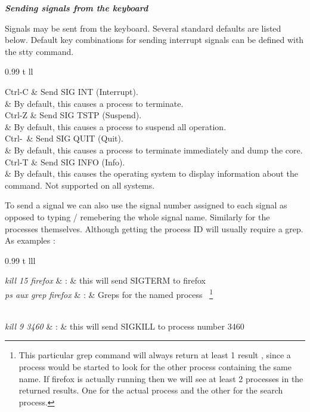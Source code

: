 

\textbf{\textit{Sending signals from the keyboard}}

Signals may be sent from the keyboard. Several standard defaults are listed below. Default key combinations for sending interrupt signals can be defined with the stty command.



\tabulartable
{0.99\linewidth}
{t}
{ll}
{


Ctrl-C & Send SIG INT (Interrupt).  \\
&  By default, this causes a process to terminate.  \\

Ctrl-Z & Send SIG TSTP (Suspend).  \\
&  By default, this causes a process to suspend all operation. \\

Ctrl-\ & Send SIG QUIT (Quit).  \\
&  By default, this causes a process to terminate immediately and dump the
core. \\

Ctrl-T & Send SIG INFO (Info).  \\
&  By default, this causes the operating system to display information about
the command. Not supported on all systems. \\

}


To send a signal we can also use the signal number assigned to each signal as
opposed to typing / remebering the whole signal name. Similarly for the
processes themselves. Although getting the process ID will usually require a
grep. As examples :


\tabulartable
{0.99\linewidth}
{t}
{lll}
{

\textit{kill 15 firefox} & : & this will send SIGTERM to firefox\\

\textit{ps aux \textbar grep firefox} & : & Greps for the named process
~\footnote{
This particular grep command will always return at least 1 result , since a
process would be started to look for the other process containing the same name.
If firefox is actually running then we will see at least 2 processes in the
returned results. One for the actual process and the other for the search
process.
}

\\

\textit{kill 9 3460} &  : & this will send SIGKILL to process number 3460\\

}

